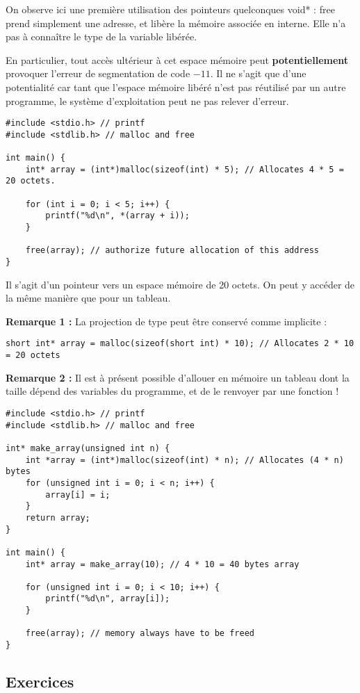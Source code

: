 \documentclass[../../../main.tex]{subfiles}
\begin{document}
On observe ici une première utilisation des pointeurs quelconques \textsf{void*} : \textsf{free} prend simplement une adresse, et libère la mémoire associée en interne. Elle n'a pas à connaître le type de la variable libérée.
 
En particulier, tout accès ultérieur à cet espace mémoire peut \textbf{potentiellement} provoquer l'erreur de segmentation de code $-11$. Il ne s'agit que d'une potentialité car tant que l'espace mémoire libéré n'est pas réutilisé par un autre programme, le système d'exploitation peut ne pas relever d'erreur.
\begin{verbatim}
#include <stdio.h> // printf
#include <stdlib.h> // malloc and free

int main() {
	int* array = (int*)malloc(sizeof(int) * 5); // Allocates 4 * 5 = 20 octets.

	for (int i = 0; i < 5; i++) {
		printf("%d\n", *(array + i));
	}

	free(array); // authorize future allocation of this address
}
\end{verbatim}
Il s'agit d'un pointeur vers un espace mémoire de 20 octets. On peut y accéder de la même manière que pour un tableau.
 
\textbf{Remarque 1 :} La projection de type peut être conservé comme implicite :
\begin{verbatim}
short int* array = malloc(sizeof(short int) * 10); // Allocates 2 * 10 = 20 octets
\end{verbatim}
\textbf{Remarque 2 :} Il est à présent possible d'allouer en mémoire un tableau dont la taille dépend des variables du programme, et de le renvoyer par une fonction !
\begin{verbatim}
#include <stdio.h> // printf
#include <stdlib.h> // malloc and free

int* make_array(unsigned int n) {
	int *array = (int*)malloc(sizeof(int) * n); // Allocates (4 * n) bytes
	for (unsigned int i = 0; i < n; i++) {
		array[i] = i;
	}
	return array;
}

int main() {
	int* array = make_array(10); //	4 * 10 = 40 bytes array

	for (unsigned int i = 0; i < 10; i++) {
		printf("%d\n", array[i]);
	}

	free(array); // memory always have to be freed
}
\end{verbatim}
\subsection{Exercices}
\end{document}
